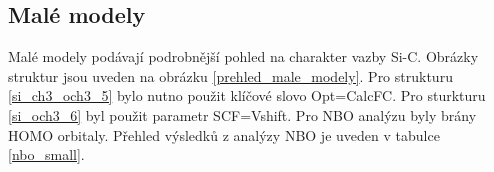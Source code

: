 \documentclass[
  digital, %
  table,   %
  lof,     %
  lot,     %
  oneside,
]{fithesis3}
\begin{document}
\subsection{Malé modely}
Malé modely podávají podrobnější pohled na charakter vazby Si-C. Obrázky struktur jsou uveden na obrázku \ref{prehled_male_modely}. Pro strukturu  \ref{si_ch3_och3_5} bylo nutno použit klíčové slovo Opt=CalcFC. Pro sturkturu  \ref{si_och3_6} byl použit parametr SCF=Vshift. Pro NBO analýzu byly brány HOMO orbitaly.
Přehled výsledků z analýzy NBO je uveden v tabulce \ref{nbo_small}.
\begin{figure}
\begin{center}

\end{center}
\end{figure}
\end{document}
